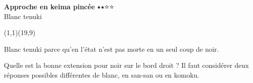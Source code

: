 \documentclass[preview, border=0pt, varwidth=false]{standalone}
\begin{document}
	\setgounit{0.4cm} 
	
\parbox[c][14.65cm][c]{10.2cm}{
	\centering
	
	{\Large\textbf{Approche en keima pincée} $\medblackstar \medblackstar \medwhitestar \medwhitestar$ \\ Blanc tenuki}
	\vspace{3em}
	
	\begin{psgopartialboard}{(1,1)(19,9)}
		\pass
	\end{psgopartialboard}
	
	\vspace{1em}
	Blanc tenuki parce qu'en l'état  n'est pas morte en un seul coup de noir.  \\

	\bigskip

	Quelle est la bonne extension pour noir sur le bord droit ? Il faut considérer deux réponses possibles différentes de blanc, en san-san ou en komoku.
}
\end{document}
